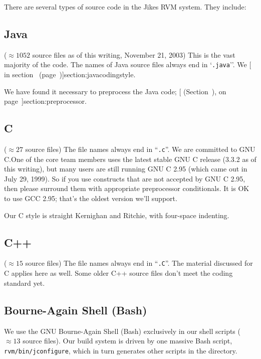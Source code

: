 There are several types of source code in the Jikes RVM system.  They
include:


\subsection{Java} 
($\approx 1052$ source files as of this writing, November 21, 2003)  This is
the vast majority of the code.  The names of Java source files always end in
`{\tt .java}''.   We [ in
section~\Ref{} (page~\Pageref)]{section:javacodingstyle}. 

We have found it necessary to preprocess the Java code; [ 
  (Section~\Ref), on page~\Pageref]{section:preprocessor}.


\subsection{C}

($\approx 27$ source files)  The file names always
end in ``{\tt .c}''.  We are committed to GNU C.\@  One of the core team
members uses the latest stable GNU C release (3.3.2 as of this writing), but many users
are still running GNU C 2.95 (which came out in July 29, 1999).  So if
you use constructs that are not accepted by GNU C 2.95, then please surround them with
appropriate preprocessor conditionals.  It is OK to use GCC 2.95;
that's the oldest version we'll support.

Our C style is straight Kernighan and Ritchie, with four-space
indenting.  

\subsection{C++} 

($\approx 15$ source files)  The file names always end in
``{\tt .C}''.   The material discussed for C applies here as well.
Some older C++ source files don't meet the coding standard yet.

\subsection{Bourne-Again Shell (Bash)}

We use the GNU Bourne-Again Shell (Bash) exclusively in our shell
scripts ($\approx 13$ source files).  Our build system is driven by
one massive Bash script, {\tt rvm/bin/jconfigure}, which in turn
generates other scripts in the  directory.

